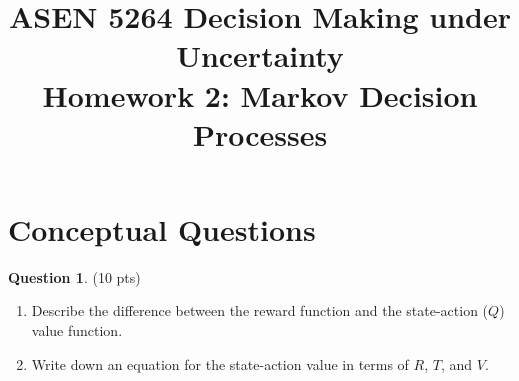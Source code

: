 \documentclass{article}
\title{ASEN 5264 Decision Making under Uncertainty\\
       Homework 2: Markov Decision Processes}
\theoremstyle{definition}
\newtheorem{question}[thm]{Question}
\begin{document}
\maketitle

\section{Conceptual Questions}

\begin{question} (10 pts)
    \begin{enumerate}[label=\alph*)]
        \item Describe the difference between the reward function and the state-action ($Q$) value function.
        \item Write down an equation for the state-action value in terms of $R$, $T$, and $V$.
    \end{enumerate}
\end{question}

\end{document}
